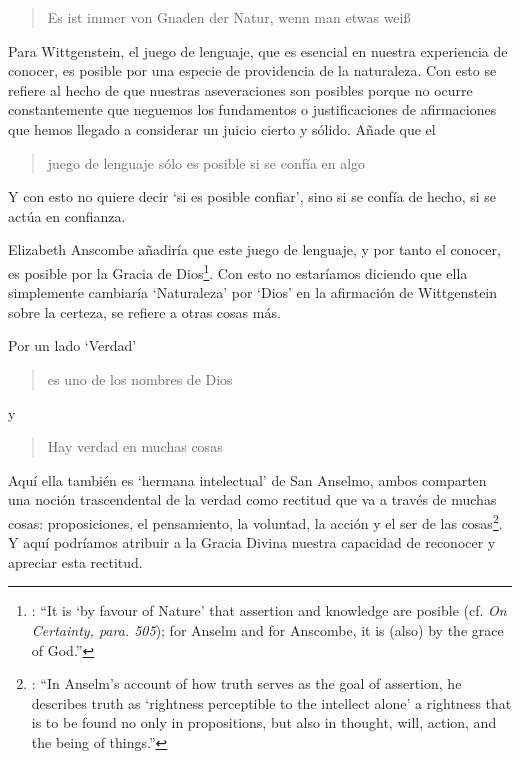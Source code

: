 \blockquote[{\Cite[\S505]{wittgenstein1969oncertes}}]{Es ist immer von Gnaden der Natur, wenn man etwas weiß}. Para Wittgenstein, el juego de lenguaje, que es esencial en nuestra experiencia de conocer, es posible por una especie de providencia de la naturaleza. Con esto se refiere al hecho de que nuestras aseveraciones son posibles porque no ocurre constantemente que neguemos los fundamentos o justificaciones de afirmaciones que hemos llegado a considerar un juicio cierto y sólido. Añade que el \blockquote[{\Cite[\S509]{wittgenstein1969oncertes}}]{juego de lenguaje sólo es posible si se confía en algo}. Y con esto no quiere decir \enquote*{si es posible confiar}, sino si se confía de hecho, si se actúa en confianza.

Elizabeth Anscombe añadiría que este juego de lenguaje, y por tanto el conocer, es posible por la Gracia de Dios\footnote{\Cite[Cf.][224]{teichmann2008ans}: \enquote{It is `by favour of Nature' that assertion and knowledge are posible (cf. \emph{On Certainty, para. 505}); for Anselm and for Anscombe, it is (also) by the grace of God.}}. Con esto no estaríamos diciendo que ella simplemente cambiaría `Naturaleza' por `Dios' en la afirmación de Wittgenstein sobre la certeza, se refiere a otras cosas más.

Por un lado `Verdad' \blockquote[{\Cite[47]{torralbaynubiola2005fayeh:verdad}}]{es uno de los nombres de Dios} y \blockquote[{\Cite[47]{torralbaynubiola2005fayeh:verdad}}]{Hay verdad en muchas cosas}. Aquí ella también es `hermana intelectual' de San Anselmo, ambos comparten una noción trascendental de la verdad como rectitud que va a través de muchas cosas: proposiciones, el pensamiento, la voluntad, la acción y el ser de las cosas\footnote{\Cite[Cf.][197]{teichmann2008ans}: \enquote{In Anselm's account of how truth serves as the goal of assertion, he describes truth as `rightness perceptible to the intellect alone' \textelp{} a rightness that is to be found no only in propositions, but also in thought, will, action, and the being of things.}}. Y aquí podríamos atribuir a la Gracia Divina nuestra capacidad de reconocer y apreciar esta rectitud.

